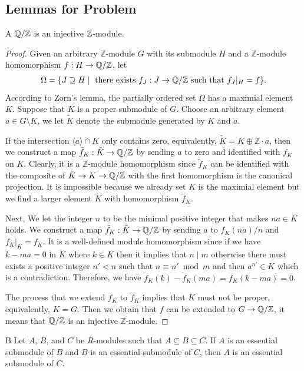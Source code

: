 \subsection*{Lemmas for Problem}
\begin{lemma}{A}
     $\mathbb{Q}/\mathbb{Z}$ is an injective $\mathbb{Z}$-module.
\end{lemma}
\begin{proof}
    Given an arbitrary $\mathbb{Z}$-module $G$ with its submodule $H$ and a $\mathbb{Z}$-module homomorphism $f:H\to \mathbb{Q}/\mathbb{Z}$, let 
    \begin{align*}
        \Omega=\{J\supseteq H\mid \text{ there exists $f_J:J\to \mathbb{Q}/\mathbb{Z}$ such that $f_J|_{H}=f$}\}.
    \end{align*}
    According to Zorn's lemma, the partially ordered set $\Omega$ has a maximial element $K$.
    Suppose that $K$ is a proper submodule of $G$.
    Choose an arbitrary element $a\in G\setminus K$, we let $\tilde{K}$ denote the submodule generated by $K$ and $a$.
    
    If the intersection $\langle a \rangle\cap K$ only contains zero, equivalently, $\tilde{K}= K\oplus \mathbb{Z}\cdot a$, then we construct a map $\tilde{f}_K:\tilde{K}\to \mathbb{Q}/\mathbb{Z}$  
    by sending $a$ to zero and identified with $f_K$ on $K$. Clearly, it is a $\mathbb{Z}$-module homomorphism since $\tilde{f}_K$ can be identified with the composite of $\tilde{K}\to K \to \mathbb{Q}/\mathbb{Z}$ with the first homomorphism is the canonical projection.
    It is impossible because we already set $K$ is the maximial element but we find a larger element $\tilde{K}$ with homomorphism $\tilde{f}_K$.
    
    Next, We let the integer $n$ to be the minimal positive integer that makes $na\in K$ holds. We construct a map $\tilde{f}_K:\tilde{K}\to \mathbb{Q}/\mathbb{Z}$ by sending $a$ to $f_K(na)/n$ and $\tilde{f}_K|_K = f_K$. 
    It is a well-defined module homomorphism since if we have $k-ma=0$ in $\tilde{K}$ where $k\in K$ then it implies that $n\mid m $ otherwise there must exists a positive integer $n'<n$ such that $n\equiv n'\bmod m$ and then $a^{n'}\in K$ which is a contradiction.
    Therefore, we have $\tilde{f}_K(k)-\tilde{f}_K(ma)= f_K(k-ma)=0$. 
    
    The process that we extend $f_K$ to $\tilde{f}_K$ implies that $K$ must not be proper, equivalently, $K=G$.
    Then we obtain that $f$ can be extended to $G\to\mathbb{Q}/\mathbb{Z}$, it means that $\mathbb{Q}/\mathbb{Z}$ is an injective $\mathbb{Z}$-module.
\end{proof}
\begin{lemma}{B}
    Let $A$, $B$, and $C$ be $R$-modules such that $A \subseteq B \subseteq C$.
    If $A$ is an essential submodule of $B$ and $B$ is an essential submodule of $C$, then $A$ is an essential submodule of $C$.
\end{lemma}
